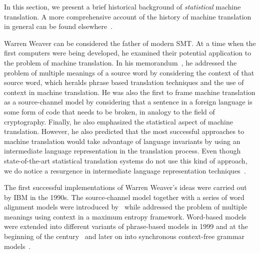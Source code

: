 
In this section, we present a brief historical background of \emph{statistical}
machine translation. A more comprehensive account of the history
of machine translation in general can be found
elsewhere~\citep{hutchins:1997:MT,hutchins:2000:MT}.

Warren Weaver can be considered the father of modern SMT.
At a time when the first computers were being developed, he
examined their potential application to the problem of machine
translation. In his memorandum~\citep{weaver:1955:Translation}, he
addressed the problem of multiple meanings of a source word
by considering the context of that source word, which heralds
phrase based translation techniques and the use of context
in machine translation. He was also
the first to frame machine translation as a source-channel
model by considering that a sentence in a foreign language
is some form of code that needs to be broken, in analogy
to the field of cryptography. Finally, he also emphasized the
statistical aspect of machine translation. However, he also
predicted that the most successful approaches to machine
translation would take advantage of language invariants by
using an intermediate language representation in the translation
process. Even though state-of-the-art statistical translation systems do not
use this kind of approach, we do notice a resurgence in intermediate
language representation techniques~\citep{mikolov-le-sutskever:2013:arxiv}.

The first successful implementations of Warren Weaver's ideas
were carried out by IBM in the 1990s. The source-channel
model together with a series of word alignment models were introduced
by~\citet{brown-dellapietra-dellapietra-mercer-1993} while
\citet{berger-dellapietra-dellapietra:1996:CL} addressed the problem
of multiple meanings using context in a maximum entropy framework.
Word-based models were extended into different variants
of phrase-based models in 1999 and at the
beginning of the
century~\citep{och-tillmann-ney:1999:EMNLP,koehn-och-marcu:2003:NAACL,och-ney:2004:CL}
and later on into synchronous context-free grammar
models~\citep{chiang:2005:ACL,chiang:2007:CL}.

